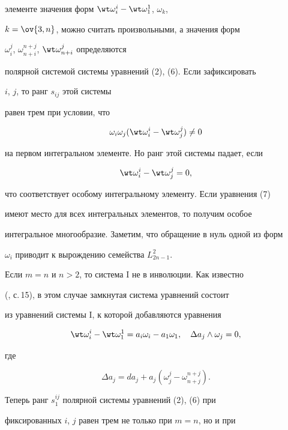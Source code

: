 элементе значения форм $\wt\omega^i_i-\wt\omega^1_1$, $\omega_k$, 


$k=\ov{3,n}$, можно считать произвольными, а значения форм 


$\omega^j_i$, $\omega^{n+j}_{n+i}$, $\wt\omega^j_{n+i}$ определяются 


полярной системой системы уравнений (2), (6). Если зафиксировать


$i$, $j$, то ранг $s_{ij}$ этой системы 


равен трем при условии, что


$$ 


\omega_i\omega_j(\wt\omega^i_i-\wt\omega^j_j)\ne0 


$$ 


на первом интегральном элементе. Но ранг этой системы падает, если 


\begin{equation} 


\wt\omega^i_i-\wt\omega^j_j=0, 


\end{equation} 


что соответствует особому интегральному элементу. Если уравнения (7) 


имеют место для всех интегральных элементов, то получим особое 


интегральное многообразие. Заметим, что обращение в нуль одной из форм 


$\omega_i$ приводит к вырождению семейства $L^2_{2n-1}$. 


 


Если $m=n$ и $n>2$, то система I не в инволюции. Как известно 


(\cite{1}, с.\,15), в этом случае замкнутая система уравнений состоит 


из уравнений системы I, к которой добавляются уравнения 


$$ 


\wt\omega^i_i-\wt\omega^1_1=a_i\omega_i-a_1\omega_1,\quad 


\Delta a_j\wedge\omega_j=0, 


$$ 


где 


$$ 


\Delta a_j=da_j+a_j(\omega^j_j-\omega^{n+j}_{n+j}). 


$$ 


Теперь ранг $s^{ij}_1$ полярной системы уравнений (2), (6) при


фиксированных $i$, $j$ равен трем не только при $m=n$, но и при


